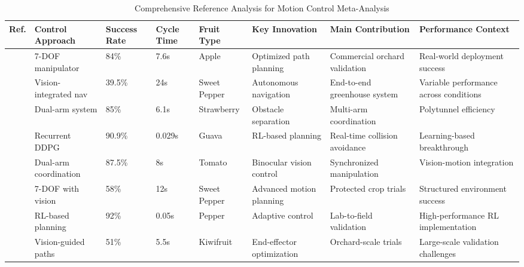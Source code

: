 \documentclass[a4paper,fleqn]{cas-dc}
\begin{document}
\begin{table}[htbp]
\centering
\footnotesize
\caption{Comprehensive Reference Analysis for Motion Control Meta-Analysis}
\label{tab:motion_control_refs}
\begin{tabular}{p{}p{}p{}p{}p{}p{}p{}p{}}
\toprule
\textbf{Ref.} & \textbf{Control Approach} & \textbf{Success Rate} & \textbf{Cycle Time} & \textbf{Fruit Type} & \textbf{Key Innovation} & \textbf{Main Contribution} & \textbf{Performance Context} \\ \midrule

\cite{silwal2017design} & 7-DOF manipulator & 84\% & 7.6s & Apple & Optimized path planning & Commercial orchard validation & Real-world deployment success \\

\cite{arad2020development} & Vision-integrated nav & 39.5\% & 24s & Sweet Pepper & Autonomous navigation & End-to-end greenhouse system & Variable performance across conditions \\

\cite{xiong2020autonomous} & Dual-arm system & 85\% & 6.1s & Strawberry & Obstacle separation & Multi-arm coordination & Polytunnel efficiency \\

\cite{lin2021collision} & Recurrent DDPG & 90.9\% & 0.029s & Guava & RL-based planning & Real-time collision avoidance & Learning-based breakthrough \\

\cite{ling2019dual} & Dual-arm coordination & 87.5\% & 8s & Tomato & Binocular vision control & Synchronized manipulation & Vision-motion integration \\

\cite{lehnert2017autonomous} & 7-DOF with vision & 58\% & 12s & Sweet Pepper & Advanced motion planning & Protected crop trials & Structured environment success \\

\cite{verbiest2022path} & RL-based planning & 92\% & 0.05s & Pepper & Adaptive control & Lab-to-field validation & High-performance RL implementation \\

\cite{williams2020improvements} & Vision-guided paths & 51\% & 5.5s & Kiwifruit & End-effector optimization & Orchard-scale trials & Large-scale validation challenges \\


\end{tabular}
\end{table}
\end{document}
